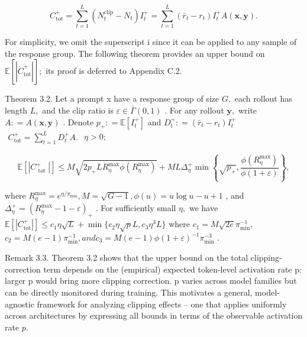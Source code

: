 \documentclass[
  10
]{article}
\begin{document}
\[
C _ {\mathrm{tot}} ^ {+} = \sum_ {t = 1} ^ {L} (N _ {t} ^ {\mathrm{clip}} - N _ {t}) I _ {t} ^ {+} = \sum_ {t = 1} ^ {L} (\bar {r} _ {t} - r _ {t}) I _ {t} ^ {+} A (\mathbf {x}, \mathbf {y}).
\]

For simplicity, we omit the superscript i since it can be applied to any
sample of the response group. The following theorem provides an upper
bound on
\(\mathbb { E } [ | \dot { C } _ { \mathrm { t o t } } ^ { \dot { + } } | ] ;\)
its proof is deferred to Appendix C.2.

Theorem 3.2. Let a prompt x have a response group of size \(G ,\) each
rollout has length \(L ,\) and the clip ratio is
\(\varepsilon \in \mathsf { \bar { \Gamma } } ( 0 , 1 )\) . For any
rollout \(\mathbf { y } ,\) write
\(A : = A ( \mathbf { x } , \mathbf { y } )\) . Denote
\(p _ { + } : = \mathbb { E } [ I _ { t } ^ { + } ]\) and
\(D _ { t } ^ { + } : = ( \bar { r } _ { t } - r _ { t } ) I _ { t } ^ { + }\)
\(\begin{array} { r } { C _ { \mathrm { t o t } } ^ { + } = \sum _ { t = 1 } ^ { L } D _ { t } ^ { + } A . } \end{array}\)
\(\eta > 0 ;\)

\[
\mathbb {E} \left[ \left| C _ {\text { tot }} ^ {+} \right| \right] \leq M \sqrt {2 p _ {+} L R _ {\eta} ^ {\max} \phi \left(R _ {\eta} ^ {\max}\right)} + M L \Delta_ {\eta} ^ {+} \min \left\{\sqrt {p _ {+}}, \frac {\phi \left(R _ {\eta} ^ {\max}\right)}{\phi (1 + \varepsilon)} \right\}, \tag {6}
\]

where
\(R _ { \eta } ^ { \mathrm { m a x } } = e ^ { \eta / \pi _ { \mathrm { m i n } } } , M = \sqrt { G - 1 } , \phi ( u ) = u \log u - u + 1\)
, and
\(\Delta _ { \eta } ^ { + } = ( R _ { \eta } ^ { \operatorname* { m a x } } - 1 - \varepsilon ) _ { + }\)
. For sufficiently small \(\eta ,\) we have
\(\mathbb { E } [ | C _ { \mathrm { t o t } } ^ { + } | ] \le c _ { 1 } \eta \sqrt { L } + \operatorname* { m i n } \{ c _ { 2 } \eta \sqrt { p } L , c _ { 3 } \eta ^ { 3 } L \}\)
where
\(c _ { 1 } = M \sqrt { 2 e } \pi _ { \mathrm { m i n } } ^ { - 1 } ,\)
\(c _ { 2 } = M ( e - 1 ) \pi _ { \mathrm { m i n } } ^ { - 1 } , a n d c _ { 3 } = M ( e - 1 ) \phi ( 1 + \varepsilon ) ^ { - 1 } \pi _ { \mathrm { m i n } } ^ { - 3 }\)
.

Remark 3.3. Theorem 3.2 shows that the upper bound on the total
clipping-correction term depends on the (empirical) expected token-level
activation rate p: larger p would bring more clipping correction. p
varies across model families but can be directly monitored during
training. This motivates a general, model-agnostic framework for
analyzing clipping effects -- one that applies uniformly across
architectures by expressing all bounds in terms of the observable
activation rate \(p .\)
\end{document}
